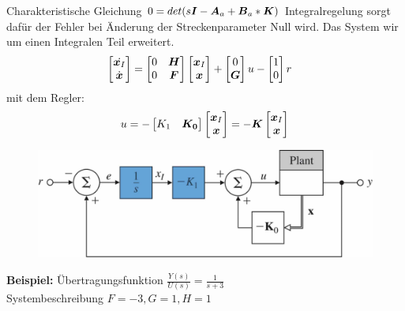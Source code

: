 \begin{tcolorbox}[colback=white!10!white,colframe=green!30!black,title=Integralregelung]
	Charakteristische Gleichung $0=det(s\boldsymbol{I}-\boldsymbol{A}_a+\boldsymbol{B}_a*\boldsymbol{K})$
	Integralregelung  sorgt dafür der Fehler bei Änderung der Streckenparameter Null wird. Das System wir um einen Integralen Teil erweitert.
	\begin{align*}
		\begin{bmatrix}
		\dot{	\boldsymbol{x}_I} \\ \dot{	\boldsymbol{x}}
		\end{bmatrix} &= \begin{bmatrix}
		0 & \boldsymbol{H} \\ 0 & \boldsymbol{F}
		\end{bmatrix}\begin{bmatrix}
			\boldsymbol{x}_I \\	\boldsymbol{x}
		\end{bmatrix}+
		\begin{bmatrix}
		0 \\ \boldsymbol{G}
		\end{bmatrix} u - \begin{bmatrix}
		1 \\ 0
		\end{bmatrix}r
	\end{align*}
	mit dem Regler:
	\begin{align*}
		u = -\begin{bmatrix}
		 K_1 & \boldsymbol{K_0}
		\end{bmatrix} \begin{bmatrix}
			\boldsymbol{x}_I \\\boldsymbol{x}
		\end{bmatrix} = - \boldsymbol{K} \begin{bmatrix}
		\boldsymbol{x}_I \\\boldsymbol{x}
		\end{bmatrix}
	\end{align*}
	
	\begin{figure}[H]
\centering
\includegraphics[width=0.7\linewidth]{content/img/integral}

\end{figure}
\tcblower
\textbf{Beispiel:}
Übertragungsfunktion $\frac{Y(s)}{U(s)} = \frac{1}{s+3}$\\
Systembeschreibung $F = -3, G = 1, H = 1$


\end{tcolorbox}
